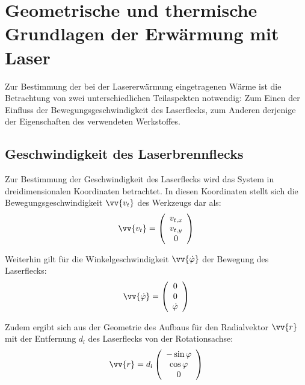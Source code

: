 \section{Geometrische und thermische Grundlagen der Erwärmung mit Laser}

Zur Bestimmung der bei der Lasererwärmung eingetragenen Wärme ist die Betrachtung von zwei unterschiedlichen Teilaspekten notwendig: Zum Einen der Einfluss der Bewegungsgeschwindigkeit des Laserflecks, zum Anderen derjenige der Eigenschaften des verwendeten Werkstoffes.

\subsection{Geschwindigkeit des Laserbrennflecks}

Zur Bestimmung der Geschwindigkeit des Laserflecks wird das System in dreidimensionalen Koordinaten betrachtet. In diesen Koordinaten stellt sich die Bewegungsgeschwindigkeit $\vv{v_t}$ des Werkzeugs dar als:
\begin{equation}
 \vv{v_t} = \left(\begin{array}{c}v_{t,x}\\v_{t,y}\\0\end{array}\right)
 \label{eqn:toolvel3d}
\end{equation}

Weiterhin gilt für die Winkelgeschwindigkeit $\vv{\dot{\varphi}}$ der Bewegung des Laserflecks:
\begin{equation}
 \vv{\dot{\varphi}} = \left(\begin{array}{c}0\\0\\\dot{\varphi}\end{array}\right)
 \label{eqn:laserrotvel3d}
\end{equation}
 
Zudem ergibt sich aus der Geometrie des Aufbaus %
für den Radialvektor $\vv{r}$ mit der Entfernung $d_l$ des Laserflecks von der Rotationsachse:
\begin{equation}
\vv{r} = d_l\left(\begin{array}{c}-\sin\varphi\\\cos\varphi\\0\end{array}\right)
\label{eqn:radvec3d}
\end{equation}


